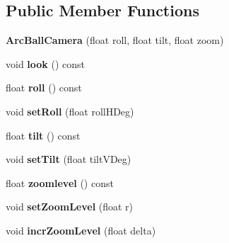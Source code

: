 \subsection*{Public Member Functions}
\begin{DoxyCompactItemize}
\item 
\hypertarget{classps_1_1scene_1_1ArcBallCamera_a547389f27ab9e3995b953008b6306ac2}{}{\bfseries Arc\+Ball\+Camera} (float roll, float tilt, float zoom)\label{classps_1_1scene_1_1ArcBallCamera_a547389f27ab9e3995b953008b6306ac2}

\item 
\hypertarget{classps_1_1scene_1_1ArcBallCamera_a15aefd2b4d416b066959d8b46ad92b1c}{}void {\bfseries look} () const \label{classps_1_1scene_1_1ArcBallCamera_a15aefd2b4d416b066959d8b46ad92b1c}

\item 
\hypertarget{classps_1_1scene_1_1ArcBallCamera_ae70625ca7be7003f20afdc26ecc4dd06}{}float {\bfseries roll} () const \label{classps_1_1scene_1_1ArcBallCamera_ae70625ca7be7003f20afdc26ecc4dd06}

\item 
\hypertarget{classps_1_1scene_1_1ArcBallCamera_a30b95e4c33decfcf74d59b9c4d4858bf}{}void {\bfseries set\+Roll} (float roll\+H\+Deg)\label{classps_1_1scene_1_1ArcBallCamera_a30b95e4c33decfcf74d59b9c4d4858bf}

\item 
\hypertarget{classps_1_1scene_1_1ArcBallCamera_a78d152d433db1038295061c6248e2f0f}{}float {\bfseries tilt} () const \label{classps_1_1scene_1_1ArcBallCamera_a78d152d433db1038295061c6248e2f0f}

\item 
\hypertarget{classps_1_1scene_1_1ArcBallCamera_a9ec90b07a1b07be7280c7f3856130ccb}{}void {\bfseries set\+Tilt} (float tilt\+V\+Deg)\label{classps_1_1scene_1_1ArcBallCamera_a9ec90b07a1b07be7280c7f3856130ccb}

\item 
\hypertarget{classps_1_1scene_1_1ArcBallCamera_a144a4b47c76575b9577079fe7534c258}{}float {\bfseries zoomlevel} () const \label{classps_1_1scene_1_1ArcBallCamera_a144a4b47c76575b9577079fe7534c258}

\item 
\hypertarget{classps_1_1scene_1_1ArcBallCamera_a54d575e650e2a8bb35fa830409279852}{}void {\bfseries set\+Zoom\+Level} (float r)\label{classps_1_1scene_1_1ArcBallCamera_a54d575e650e2a8bb35fa830409279852}

\item 
\hypertarget{classps_1_1scene_1_1ArcBallCamera_ac1a5c192a1b489769aadf2a794dfa149}{}void {\bfseries incr\+Zoom\+Level} (float delta)\label{classps_1_1scene_1_1ArcBallCamera_ac1a5c192a1b489769aadf2a794dfa149}


\end{DoxyCompactItemize}
